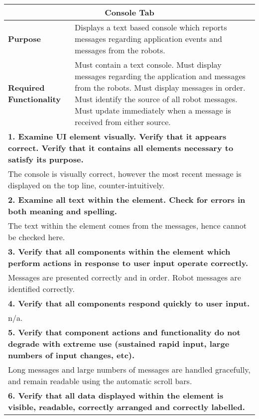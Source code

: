 \clearpage

\begin{longtable}{ l p{10cm} }
 \hline
 \multicolumn{2}{c}{\textbf{Console Tab}}\\
 \hline
 \textbf{Purpose} & Displays a text based console which reports messages regarding application events and messages from the robots.\\
 \textbf{Required Functionality} & Must contain a text console. Must display messages regarding the application and messages from the robots. Must display messages in order. Must identify the source of all robot messages. Must update immediately when a message is received from either source. \\
 \hline
 \multicolumn{2}{p{14cm}}{\textbf{1. Examine UI element visually. Verify that it appears correct. Verify that it contains all elements necessary to satisfy its purpose.}}\\
 \multicolumn{2}{p{14cm}}{The console is visually correct, however the most recent message is displayed on the top line, counter-intuitively.}\\
 \hline
 \multicolumn{2}{p{14cm}}{\textbf{2. Examine all text within the element. Check for errors in both meaning and spelling.}}\\
 \multicolumn{2}{p{14cm}}{The text within the element comes from the messages, hence cannot be checked here.}\\
 \hline
 \multicolumn{2}{p{14cm}}{\textbf{3. Verify that all components within the element which perform actions in response to user input operate correctly.}}\\
 \multicolumn{2}{p{14cm}}{Messages are presented correctly and in order. Robot messages are identified correctly.}\\
 \hline
 \multicolumn{2}{p{14cm}}{\textbf{4. Verify that all components respond quickly to user input.}}\\
 \multicolumn{2}{p{14cm}}{n/a.}\\
 \hline
 \multicolumn{2}{p{14cm}}{\textbf{5. Verify that component actions and functionality do not degrade with extreme use (sustained rapid input, large numbers of input changes, etc).}}\\
 \multicolumn{2}{p{14cm}}{Long messages and large numbers of messages are handled gracefully, and remain readable using the automatic scroll bars.}\\
 \hline
 \multicolumn{2}{p{14cm}}{\textbf{6. Verify that all data displayed within the element is visible, readable, correctly arranged and correctly labelled.}}\\

\end{longtable}

